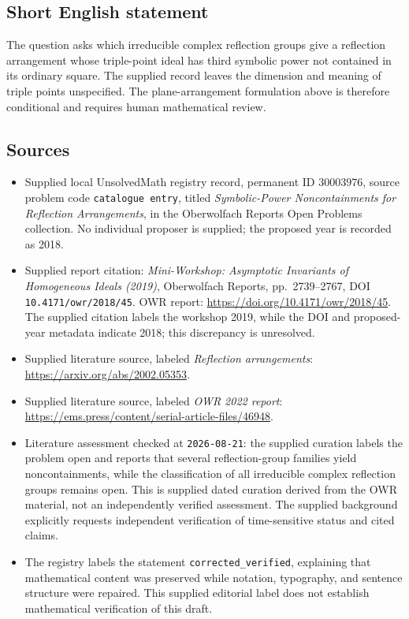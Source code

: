 \documentclass[11pt]{article}
\begin{document}
\subsection{Short English statement}
The question asks which irreducible complex reflection groups give a reflection arrangement whose triple-point ideal has third symbolic power not contained in its ordinary square. The supplied record leaves the dimension and meaning of triple points unspecified. The plane-arrangement formulation above is therefore conditional and requires human mathematical review.
\subsection{Sources}
\begin{itemize}
\item Supplied local UnsolvedMath registry record, permanent ID \(30003976\), source problem code \texttt{catalogue entry}, titled \emph{Symbolic-Power Noncontainments for Reflection Arrangements}, in the Oberwolfach Reports Open Problems collection. No individual proposer is supplied; the proposed year is recorded as 2018.
\item Supplied report citation: \emph{Mini-Workshop: Asymptotic Invariants of Homogeneous Ideals (2019)}, Oberwolfach Reports, pp.\ 2739--2767, DOI \texttt{10.4171/owr/2018/45}. OWR report: \url{https://doi.org/10.4171/owr/2018/45}. The supplied citation labels the workshop 2019, while the DOI and proposed-year metadata indicate 2018; this discrepancy is unresolved.
\item Supplied literature source, labeled \emph{Reflection arrangements}: \url{https://arxiv.org/abs/2002.05353}.
\item Supplied literature source, labeled \emph{OWR 2022 report}: \url{https://ems.press/content/serial-article-files/46948}.
\item Literature assessment checked at \texttt{2026-08-21}: the supplied curation labels the problem open and reports that several reflection-group families yield noncontainments, while the classification of all irreducible complex reflection groups remains open. This is supplied dated curation derived from the OWR material, not an independently verified assessment. The supplied background explicitly requests independent verification of time-sensitive status and cited claims.
\item The registry labels the statement \texttt{corrected\_verified}, explaining that mathematical content was preserved while notation, typography, and sentence structure were repaired. This supplied editorial label does not establish mathematical verification of this draft.
\end{itemize}
\end{document}
